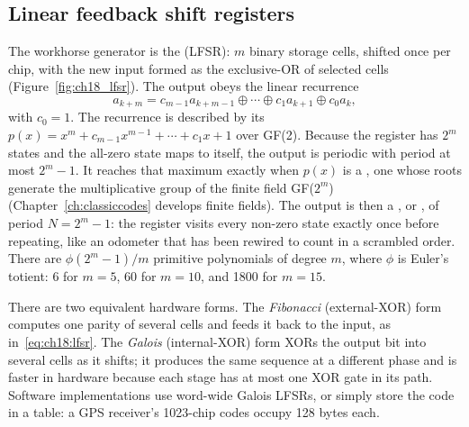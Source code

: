\subsection{Linear feedback shift registers}

The workhorse generator is the  (LFSR): $m$ binary
storage cells, shifted once per chip, with the new input formed as the exclusive-OR of
selected cells (Figure~\ref{fig:ch18_lfsr}). The output obeys the linear recurrence
\begin{equation}
a_{k+m}=c_{m-1}a_{k+m-1}\oplus\cdots\oplus c_1a_{k+1}\oplus c_0a_k,
\label{eq:ch18:lfsr}
\end{equation}
with $c_0=1$. The recurrence is described by its 
$p(x)=x^m+c_{m-1}x^{m-1}+\cdots+c_1x+1$ over GF(2). Because the register has $2^m$ states
and the all-zero state maps to itself, the output is periodic with period at most $2^m-1$.
It reaches that maximum exactly when $p(x)$ is a , one whose
roots generate the multiplicative group of the finite field GF($2^m$)
(Chapter~\ref{ch:classiccodes} develops finite fields). The output is then a
, or , of period $N=2^m-1$: the register visits
every non-zero state exactly once before repeating, like an odometer that has been rewired to
count in a scrambled order. There are $\phi(2^m-1)/m$ primitive polynomials of degree $m$, where
$\phi$ is Euler's totient: 6 for $m=5$, 60 for $m=10$, and 1800 for $m=15$.

There are two equivalent hardware forms. The \emph{Fibonacci} (external-XOR) form computes
one parity of several cells and feeds it back to the input, as in~\eqref{eq:ch18:lfsr}. The
\emph{Galois} (internal-XOR) form XORs the output bit into several cells as it shifts; it
produces the same sequence at a different phase and is faster in hardware because each
stage has at most one XOR gate in its path. Software implementations use word-wide Galois
LFSRs, or simply store the code in a table: a GPS receiver's 1023-chip codes occupy 128
bytes each.


